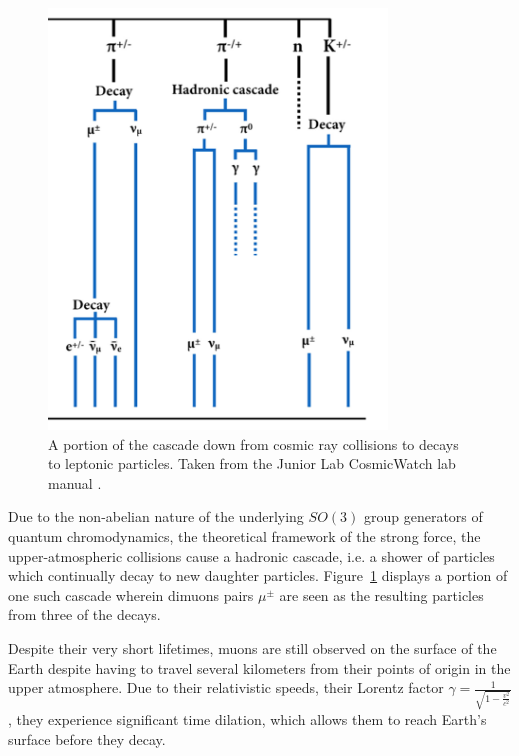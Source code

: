 \documentclass[aps,twocolumn,secnumarabic,balancelastpage,amsmath,amssymb,nofootinbib, floatfix]{revtex4-2}
\begin{document}
	\begin{figure}
		\includegraphics[width=9cm]{hadron_cascade.png}
		\caption{A portion of the cascade down from cosmic ray collisions to decays to leptonic particles. Taken from the Junior Lab CosmicWatch lab manual \cite{labmanual}.}
		\label{fig:cascade}
	\end{figure}

	Due to the non-abelian nature of the underlying $SO(3)$ group generators of quantum chromodynamics, the theoretical framework of the strong force, the upper-atmospheric collisions cause a hadronic cascade, i.e. a shower of particles which continually decay to new daughter particles. Figure~\ref{fig:cascade} displays a portion of one such cascade wherein dimuons pairs $\mu^{\pm}$ are seen as the resulting particles from three of the decays.
	
	Despite their very short lifetimes, muons are still observed on the surface of the Earth despite having to travel several kilometers from their points of origin in the upper atmosphere. Due to their relativistic speeds, their Lorentz factor $\gamma=\frac{1}{\sqrt{1-\frac{v^{2}}{c^{2}}}}$, they experience significant time dilation, which allows them to reach Earth's surface before they decay.
\end{document}
